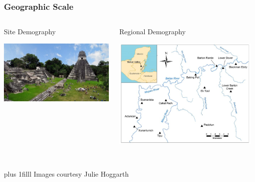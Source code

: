 \documentclass{beamer}
\newcommand{\btVFill}{\vskip0pt plus 1filll}
\begin{document}
\begin{frame}
  \frametitle{Geographic Scale}
  \begin{columns}[c]
     \begin{block}{Site Demography}
      \begin{center}
        \includegraphics[width=1\textwidth]{maya_site.jpg}\
      \end{center}
    \end{block}
    \pause

     \begin{block}{Regional Demography}
      \begin{center}
        \includegraphics[width=1\textwidth]{belize_region.jpg}\
      \end{center}
    \end{block}
  \end{columns}

  \btVFill
  \small Images courtesy Julie Hoggarth \normalsize
\end{frame}
\end{document}
